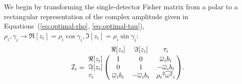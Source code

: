 \documentclass[amsmath,amssymb,aps,prx,reprint,nopreprintnumbers,nofootinbib,showpacs]{revtex4-1}
\begin{document}
We begin by transforming the single\nobreakdashes-detector Fisher matrix from a polar to a rectangular representation of the complex amplitude given in Equations~(\ref{eq:optimal-rho}, \ref{eq:optimal-tau}), $\rho_i, \gamma_i \rightarrow \Re[z_i] = \rho_i \cos \gamma_i, \Im[z_i] = \rho_i \sin \gamma_i$:
%
\begin{equation}\label{eq:fisher-matrix-extrinsic-one-detector-cartesian}
    \mathcal{I}_i = \bordermatrix{
        ~ & \Re[z_i] & \Im[z_i] & \tau_i \cr
        \Re[z_i] &
        1 &
        0 &
        {\overline{\omega}}_i b_i \cr
        \Im[z_i] &
        0 &
        1 &
        -{\overline{\omega}}_i b_i \cr
        \tau_i &
        {\overline{\omega}}_i b_i &
        -{\overline{\omega}}_i b_i &
        {\rho_i}^2 {\overline{\omega^2}}_i
    }.
\end{equation}
\end{document}
